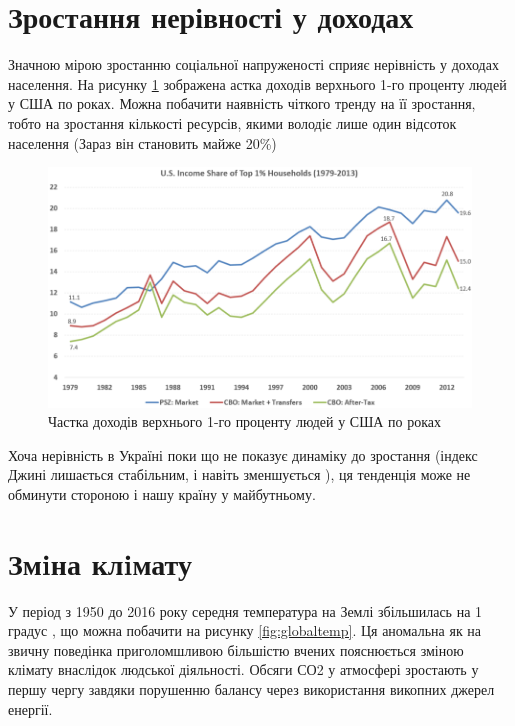     \section{Зростання нерівності у доходах}
        
        Значною мірою зростанню соціальної напруженості сприяє нерівність у доходах населення. На рисунку \ref{fig:income_us}
        зображена астка доходів верхнього 1-го проценту людей у США по роках. Можна побачити наявність чіткого тренду на її зростання,
        тобто на зростання кількості ресурсів, якими володіє лише один відсоток населення (Зараз він становить майже 20\%)

        \begin{figure}[!htp]
            \centering
            \includegraphics[scale = 0.7]{PNG/income_us.png}
            \caption{Частка доходів верхнього 1-го проценту людей у США по роках}
            \label{fig:income_us}
        \end{figure}

        Хоча нерівність в Україні поки що не показує динаміку до зростання (індекс Джині лишається стабільним, і навіть зменшується
        \cite{giniukr}), ця тенденція може не обминути стороною і нашу країну у майбутньому.

    \section{Змiна клiмату}

        У період з 1950 до 2016 року середня температура на Землі збільшилась на 1 градус \cite{nasa},
        що можна побачити на рисунку \ref{fig:globaltemp}. Ця аномальна як на звичну поведінка 
        приголомшливою більшістю вчених \cite{nasacons} пояснюється зміною клімату внаслідок людської діяльності.
        Обсяги СО2 у атмосфері зростають
        у першу чергу завдяки порушенню балансу через використання викопних джерел енергії. 

